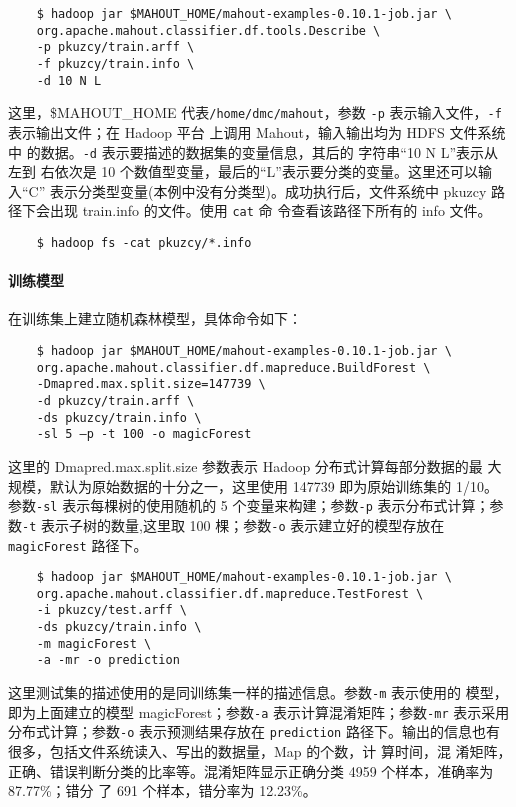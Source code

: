 \begin{lstlisting}
	$ hadoop jar $MAHOUT_HOME/mahout-examples-0.10.1-job.jar \
	org.apache.mahout.classifier.df.tools.Describe \
	-p pkuzcy/train.arff \
	-f pkuzcy/train.info \
	-d 10 N L
\end{lstlisting}

这里，\$MAHOUT\_HOME 代表\texttt{/home/dmc/mahout}，参数 \lstinline|-p| 表示输入文件，\lstinline|-f|
表示输出文件；在 Hadoop 平台 上调用 Mahout，输入输出均为 HDFS 文件系统中
的数据。\lstinline|-d| 表示要描述的数据集的变量信息，其后的 字符串``10 N
L''表示从左到 右依次是 10
个数值型变量，最后的``L''表示要分类的变量。这里还可以输入``C''
表示分类型变量(本例中没有分类型)。成功执行后，文件系统中 pkuzcy
路径下会出现 train.info 的文件。使用 \lstinline|cat| 命 令查看该路径下所有的 info
文件。

\begin{lstlisting}
	$ hadoop fs -cat pkuzcy/*.info
\end{lstlisting}

\paragraph{训练模型}\label{ux8badux7ec3ux6a21ux578b}

在训练集上建立随机森林模型，具体命令如下：

\begin{lstlisting}
	$ hadoop jar $MAHOUT_HOME/mahout-examples-0.10.1-job.jar \
	org.apache.mahout.classifier.df.mapreduce.BuildForest \
	-Dmapred.max.split.size=147739 \
	-d pkuzcy/train.arff \
	-ds pkuzcy/train.info \
	-sl 5 –p -t 100 -o magicForest
\end{lstlisting}

这里的 Dmapred.max.split.size 参数表示 Hadoop 分布式计算每部分数据的最
大规模，默认为原始数据的十分之一，这里使用 147739 即为原始训练集的 1/10。
参数\texttt{-sl} 表示每棵树的使用随机的 5 个变量来构建；参数\texttt{-p} 表示分布式计算；参
数\texttt{-t} 表示子树的数量,这里取 100 棵；参数\texttt{-o} 表示建立好的模型存放在
\texttt{magicForest} 路径下。

\begin{lstlisting}
	$ hadoop jar $MAHOUT_HOME/mahout-examples-0.10.1-job.jar \
	org.apache.mahout.classifier.df.mapreduce.TestForest \
	-i pkuzcy/test.arff \
	-ds pkuzcy/train.info \
	-m magicForest \
	-a -mr -o prediction
\end{lstlisting}

这里测试集的描述使用的是同训练集一样的描述信息。参数\texttt{-m} 表示使用的
模型，即为上面建立的模型 magicForest；参数\texttt{-a} 表示计算混淆矩阵；参数\texttt{-mr}
表示采用分布式计算；参数\texttt{-o} 表示预测结果存放在 \texttt{prediction}
路径下。输出的信息也有很多，包括文件系统读入、写出的数据量，Map 的个数，计
算时间，混 淆矩阵，正确、错误判断分类的比率等。混淆矩阵显示正确分类 4959
个样本，准确率为 87.77\%；错分 了 691 个样本，错分率为 12.23\%。

